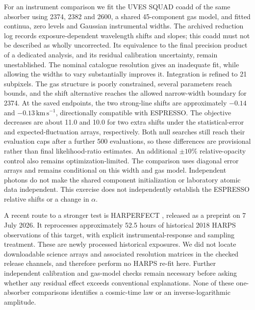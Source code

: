 For an instrument comparison we fit the UVES SQUAD coadd of the same absorber using 2374, 2382 and 2600, a shared 45-component gas model, and fitted continua, zero levels and Gaussian instrumental widths. The archived reduction log records exposure-dependent wavelength shifts and slopes; this coadd must not be described as wholly uncorrected. Its equivalence to the final precision product of a dedicated analysis, and its residual calibration uncertainty, remain unestablished. The nominal catalogue resolution gives an inadequate fit, while allowing the widths to vary substantially improves it. Integration is refined to 21 subpixels. The gas structure is poorly constrained, several parameters reach bounds, and the shift alternative reaches the allowed narrow-width boundary for 2374. At the saved endpoints, the two strong-line shifts are approximately $-0.14$ and $-0.13\,\mathrm{km\,s^{-1}}$, directionally compatible with ESPRESSO. The objective decreases are about 11.0 and 10.0 for two extra shifts under the statistical-error and expected-fluctuation arrays, respectively. Both null searches still reach their evaluation caps after a further 500 evaluations, so these differences are provisional rather than final likelihood-ratio estimates. An additional $\pm10\%$ relative-opacity control also remains optimization-limited. The comparison uses diagonal error arrays and remains conditional on this width and gas model. Independent photons do not make the shared component initialization or laboratory atomic data independent. This exercise does not independently establish the ESPRESSO relative shifts or a change in $\alpha$.

A recent route to a stronger test is HARPERFECT \cite{Milakovic2026HARPERFECT}, released as a preprint on 7 July 2026. It reprocesses approximately 52.5 hours of historical 2018 HARPS observations of this target, with explicit instrumental-response and sampling treatment. These are newly processed historical exposures. We did not locate downloadable science arrays and associated resolution matrices in the checked release channels, and therefore perform no HARPS re-fit here. Further independent calibration and gas-model checks remain necessary before asking whether any residual effect exceeds conventional explanations. None of these one-absorber comparisons identifies a cosmic-time law or an inverse-logarithmic amplitude.
